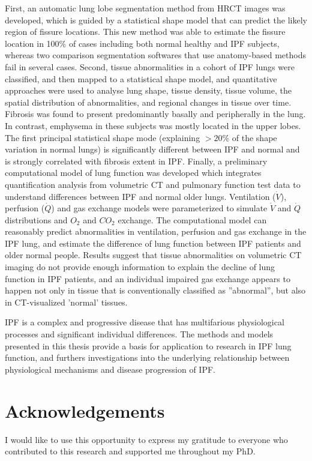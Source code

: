 \documentclass[a4paper, 12pt]{book}
\begin{document}
First, an automatic lung lobe segmentation method from HRCT images was developed, which is guided by a statistical shape model that can predict the likely region of fissure locations. This new method was able to estimate the fissure location in 100\% of cases including both normal healthy and IPF subjects, whereas two comparison segmentation softwares that use anatomy-based methods fail in several cases. Second, tissue abnormalities in a cohort of IPF lungs were classified, and then mapped to a statistical shape model, and quantitative approaches were used to analyse lung shape, tissue density, tissue volume, the spatial distribution of abnormalities, and regional changes in tissue over time. Fibrosis was found to present predominantly basally and peripherally in the lung. In contrast, emphysema in these subjects was mostly located in the upper lobes. The first principal statistical shape mode (explaining $>20\%$ of the shape variation in normal lungs) is significantly different between IPF and normal and is strongly correlated with fibrosis extent in IPF. Finally, a preliminary computational model of lung function was developed which integrates quantification analysis from volumetric CT and pulmonary function test data to understand differences between IPF and normal older lungs. Ventilation ($\dot{V}$), perfusion ($\dot{Q}$) and gas exchange models were parameterized to simulate $\dot{V}$ and $\dot{Q}$ distributions and $O_2$ and $CO_2$ exchange. The computational model can reasonably predict abnormalities in ventilation, perfusion and gas exchange in the IPF lung, and estimate the difference of lung function between IPF patients and older normal people. Results suggest that tissue abnormalities on volumetric CT imaging do not provide enough information to explain the decline of lung function in IPF patients, and an individual impaired gas exchange appears to happen not only in tissue that is conventionally classified as ''abnormal'', but also in CT-visualized 'normal' tissues.

IPF is a complex and progressive disease that has multifarious physiological processes and significant individual differences. The methods and models presented in this thesis provide a basis for application to research in IPF lung function, and furthers investigations into the underlying relationship between physiological mechanisms and disease progression of IPF.


\cleardoublepage
\chapter*{Acknowledgements}
I would like to use this opportunity to express my gratitude to everyone who contributed to this research and supported me throughout my PhD. 
\end{document}
